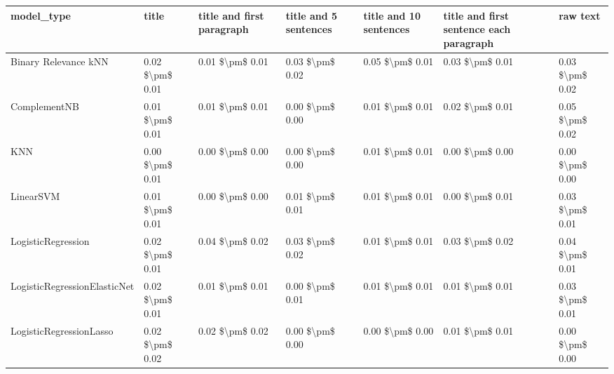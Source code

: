 \begin{tabular}{lllllll}
\toprule
                     model\_type &           title & title and first paragraph & title and 5 sentences & title and 10 sentences & title and first sentence each paragraph &            raw text \\
\midrule
           Binary Relevance kNN & 0.02 \$\textbackslash pm\$ 0.01 &           0.01 \$\textbackslash pm\$ 0.01 &       0.03 \$\textbackslash pm\$ 0.02 &        0.05 \$\textbackslash pm\$ 0.01 &                         0.03 \$\textbackslash pm\$ 0.01 &     0.03 \$\textbackslash pm\$ 0.02 \\
                   ComplementNB & 0.01 \$\textbackslash pm\$ 0.01 &           0.01 \$\textbackslash pm\$ 0.01 &       0.00 \$\textbackslash pm\$ 0.00 &        0.01 \$\textbackslash pm\$ 0.01 &                         0.02 \$\textbackslash pm\$ 0.01 &     0.05 \$\textbackslash pm\$ 0.02 \\
                            KNN & 0.00 \$\textbackslash pm\$ 0.01 &           0.00 \$\textbackslash pm\$ 0.00 &       0.00 \$\textbackslash pm\$ 0.00 &        0.01 \$\textbackslash pm\$ 0.01 &                         0.00 \$\textbackslash pm\$ 0.00 &     0.00 \$\textbackslash pm\$ 0.00 \\
                      LinearSVM & 0.01 \$\textbackslash pm\$ 0.01 &           0.00 \$\textbackslash pm\$ 0.00 &       0.01 \$\textbackslash pm\$ 0.01 &        0.01 \$\textbackslash pm\$ 0.01 &                         0.00 \$\textbackslash pm\$ 0.01 &     0.03 \$\textbackslash pm\$ 0.01 \\
             LogisticRegression & 0.02 \$\textbackslash pm\$ 0.01 &           0.04 \$\textbackslash pm\$ 0.02 &       0.03 \$\textbackslash pm\$ 0.02 &        0.01 \$\textbackslash pm\$ 0.01 &                         0.03 \$\textbackslash pm\$ 0.02 &     0.04 \$\textbackslash pm\$ 0.01 \\
   LogisticRegressionElasticNet & 0.02 \$\textbackslash pm\$ 0.01 &           0.01 \$\textbackslash pm\$ 0.01 &       0.00 \$\textbackslash pm\$ 0.01 &        0.01 \$\textbackslash pm\$ 0.01 &                         0.01 \$\textbackslash pm\$ 0.01 &     0.03 \$\textbackslash pm\$ 0.01 \\
        LogisticRegressionLasso & 0.02 \$\textbackslash pm\$ 0.02 &           0.02 \$\textbackslash pm\$ 0.02 &       0.00 \$\textbackslash pm\$ 0.00 &        0.00 \$\textbackslash pm\$ 0.00 &                         0.01 \$\textbackslash pm\$ 0.01 &     0.00 \$\textbackslash pm\$ 0.00 \\

\end{tabular}
